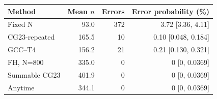 \begin{tabular}{lrrr}
\toprule
Method & Mean $n$ & Errors & Error probability (\%)\\
\midrule
Fixed N & 93.0 & 372 & 3.72 [3.36, 4.11]\\
CG23-repeated & 165.5 & 10 & 0.10 [0.048, 0.184]\\
GCC--T4 & 156.2 & 21 & 0.21 [0.130, 0.321]\\
FH, N=800 & 335.0 & 0 & 0 [0, 0.0369]\\
Summable CG23 & 401.9 & 0 & 0 [0, 0.0369]\\
Anytime & 344.1 & 0 & 0 [0, 0.0369]\\
\bottomrule
\end{tabular}
